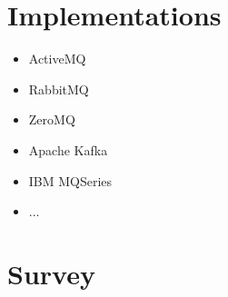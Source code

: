 \section{Implementations}
\begin{itemize}
	\item ActiveMQ 
	\item RabbitMQ
	\item ZeroMQ
	\item Apache Kafka
	\item IBM MQSeries
	\item ... 
\end{itemize}
\section{Survey}


